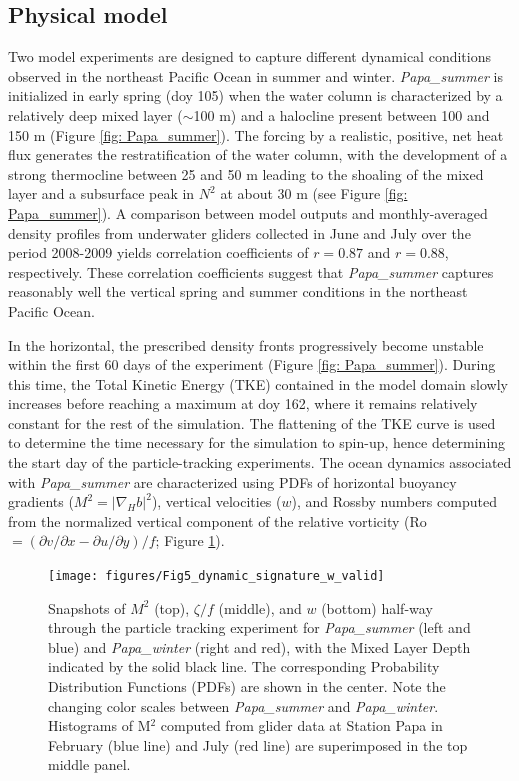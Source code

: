 \documentclass[draft,linenumbers]{agujournal2018}
\begin{document}
\subsection{Physical model}

Two model experiments are designed to capture different dynamical conditions observed in the northeast Pacific Ocean in summer and winter. \textit{Papa\_summer} is initialized in early spring (doy 105) when the water column is characterized by a relatively deep mixed layer ($\sim$100 m) and a halocline present between 100 and 150 m (Figure \ref{fig: Papa_summer}). The forcing by a realistic, positive, net heat flux generates the restratification of the water column, with the development of a strong thermocline between 25 and 50 m leading to the shoaling of the mixed layer and a subsurface peak in $N^2$ at about 30 m (see Figure \ref{fig: Papa_summer}). A comparison between model outputs and monthly-averaged density profiles from underwater gliders collected in June and July over the period 2008-2009 yields correlation coefficients of $r = 0.87$ and $r = 0.88$, respectively. These correlation coefficients suggest that \textit{Papa\_summer} captures reasonably well the vertical spring and summer conditions in the northeast Pacific Ocean.

In the horizontal, the prescribed density fronts progressively become unstable within the first 60 days of the experiment (Figure \ref{fig: Papa_summer}). During this time, the Total Kinetic Energy (TKE) contained in the model domain slowly increases before reaching a maximum at doy 162, where it remains relatively constant for the rest of the simulation. The flattening of the TKE curve is used to determine the time necessary for the simulation to spin-up, hence determining the start day of the particle-tracking experiments. The ocean dynamics associated with \textit{Papa\_summer} are characterized using PDFs of horizontal buoyancy gradients ($M^2 = |\nabla_Hb|^2$), vertical velocities ($w$), and Rossby numbers computed from the normalized vertical component of the relative vorticity (Ro $=( \partial v/ \partial x - \partial u/ \partial y)/f$; Figure \ref{fig: dynamics}).

\begin{figure}[t]
	\centering
	\texttt{[image: figures/Fig5\_dynamic\_signature\_w\_valid]}
	\caption{Snapshots of $M^2$ (top), $\zeta /f$ (middle), and $w$ (bottom) half-way through the particle tracking experiment for \textit{Papa\_summer} (left and blue) and \textit{Papa\_winter} (right and red), with the Mixed Layer Depth indicated by the solid black line. The corresponding Probability Distribution Functions (PDFs) are shown in the center. Note the changing color scales between \textit{Papa\_summer} and \textit{Papa\_winter}. Histograms of M$^2$ computed from glider data at Station Papa in February (blue line) and July (red line) are superimposed in the top middle panel.}
	\label{fig: dynamics}
\end{figure}
\end{document}
